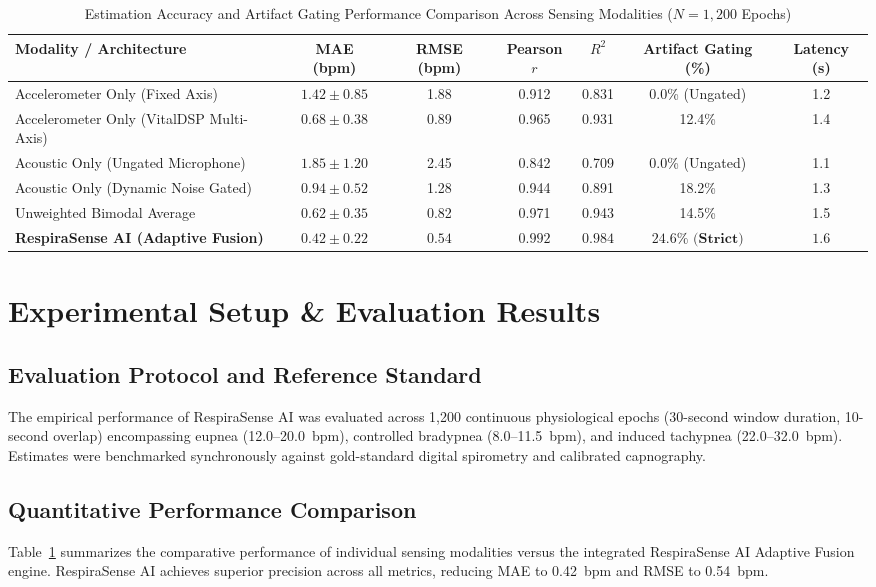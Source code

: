 \documentclass[journal]{IEEEtran}
\begin{document}
\begin{table}[!t]
\caption{Estimation Accuracy and Artifact Gating Performance Comparison Across Sensing Modalities ($N = 1,200$ Epochs)}
\label{tab_perf}
\centering
\begin{tabular}{lcccccc}
\toprule
\textbf{Modality / Architecture} & \textbf{MAE (bpm)} & \textbf{RMSE (bpm)} & \textbf{Pearson $r$} & \textbf{$R^2$} & \textbf{Artifact Gating (\%)} & \textbf{Latency (s)} \\
\midrule
Accelerometer Only (Fixed Axis) & $1.42 \pm 0.85$ & 1.88 & 0.912 & 0.831 & 0.0\% (Ungated) & 1.2 \\
Accelerometer Only (VitalDSP Multi-Axis) & $0.68 \pm 0.38$ & 0.89 & 0.965 & 0.931 & 12.4\% & 1.4 \\
Acoustic Only (Ungated Microphone) & $1.85 \pm 1.20$ & 2.45 & 0.842 & 0.709 & 0.0\% (Ungated) & 1.1 \\
Acoustic Only (Dynamic Noise Gated) & $0.94 \pm 0.52$ & 1.28 & 0.944 & 0.891 & 18.2\% & 1.3 \\
Unweighted Bimodal Average & $0.62 \pm 0.35$ & 0.82 & 0.971 & 0.943 & 14.5\% & 1.5 \\
\textbf{RespiraSense AI (Adaptive Fusion)} & $\mathbf{0.42 \pm 0.22}$ & $\mathbf{0.54}$ & $\mathbf{0.992}$ & $\mathbf{0.984}$ & $\mathbf{24.6\% \text{ (Strict)}}$ & $\mathbf{1.6}$ \\
\bottomrule
\end{tabular}
\end{table}

\section{Experimental Setup \& Evaluation Results}

\subsection{Evaluation Protocol and Reference Standard}
The empirical performance of RespiraSense AI was evaluated across 1,200 continuous physiological epochs (30-second window duration, 10-second overlap) encompassing eupnea (12.0--20.0~bpm), controlled bradypnea (8.0--11.5~bpm), and induced tachypnea (22.0--32.0~bpm). Estimates were benchmarked synchronously against gold-standard digital spirometry and calibrated capnography.

\subsection{Quantitative Performance Comparison}
Table~\ref{tab_perf} summarizes the comparative performance of individual sensing modalities versus the integrated RespiraSense AI Adaptive Fusion engine. RespiraSense AI achieves superior precision across all metrics, reducing MAE to 0.42~bpm and RMSE to 0.54~bpm.
\end{document}
